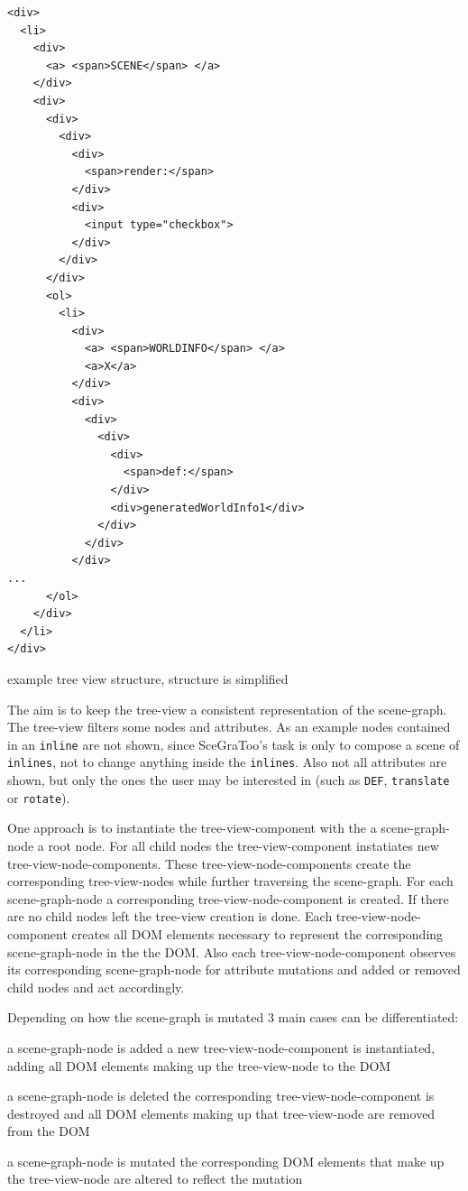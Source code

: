 \begin{listing}
  \begin{verbatim}
<div>
  <li>
    <div>
      <a> <span>SCENE</span> </a>
    </div>
    <div>
      <div>
        <div>
          <div>
            <span>render:</span>
          </div>
          <div>
            <input type="checkbox">
          </div>
        </div>
      </div>
      <ol>
        <li>
          <div>
            <a> <span>WORLDINFO</span> </a>
            <a>X</a>
          </div>
          <div>
            <div>
              <div>
                <div>
                  <span>def:</span>
                </div>
                <div>generatedWorldInfo1</div>
              </div>
            </div>
          </div>
...
      </ol>
    </div>
  </li>
</div>
  \end{verbatim}
  \caption{example tree view structure, structure is simplified}
  \label{list:tree-view}
\end{listing}

The aim is to keep the tree-view a consistent representation of the scene-graph.
The tree-view filters some nodes and attributes. As an example nodes contained
in an \texttt{inline} are not shown, since  SceGraToo's task is only to compose
a scene of \texttt{inlines}, not to change anything inside the \texttt{inlines}.
Also not all attributes are shown, but only the ones the user may be interested
in (such as \texttt{DEF}, \texttt{translate} or \texttt{rotate}).

One approach is to instantiate the tree-view-component with the a
scene-graph-node a root node. For all child nodes the tree-view-component
instatiates new tree-view-node-components. These tree-view-node-components
create the corresponding tree-view-nodes while further traversing the
scene-graph. For each scene-graph-node a corresponding tree-view-node-component
is created. If there are no child nodes left the tree-view creation is done.
Each tree-view-node-component creates all DOM elements necessary to represent
the corresponding scene-graph-node in the the DOM. Also each
tree-view-node-component observes its corresponding scene-graph-node for
attribute mutations and added or removed child nodes and act accordingly.

Depending on how the scene-graph is mutated 3 main cases can be differentiated:

\begin{description*}
  \item[a scene-graph-node is added]
    a new tree-view-node-component is instantiated, adding all DOM elements making up the tree-view-node to the DOM
  \item[a scene-graph-node is deleted]
    the corresponding tree-view-node-component is destroyed and all DOM elements making up that tree-view-node are removed from the DOM
  \item[a scene-graph-node is mutated]
    the corresponding DOM elements that make up the  tree-view-node are altered to reflect the mutation
\end{description*}

